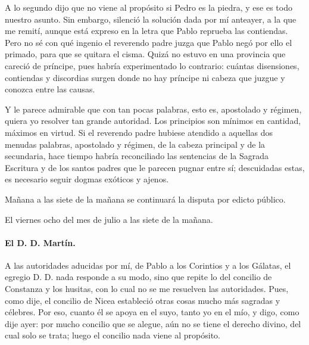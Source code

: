 A lo segundo dijo que no viene al propósito si Pedro es la piedra, y ese es todo nuestro asunto. Sin embargo, silenció la solución dada por mí anteayer, a la que me remití, aunque está expreso en la letra que Pablo reprueba las contiendas. Pero no sé con qué ingenio el reverendo padre juzga que Pablo negó por ello el primado, para que se quitara el cisma. Quizá no estuvo en una provincia que careció de príncipe, pues habría experimentado lo contrario: cuántas disensiones, contiendas y discordias surgen donde no hay príncipe ni cabeza que juzgue y conozca entre las causas.

Y le parece admirable que con tan pocas palabras, esto es, apostolado y régimen, quiera yo resolver tan grande autoridad. Los principios son mínimos en cantidad, máximos en virtud. Si el reverendo padre hubiese atendido a aquellas dos menudas palabras, apostolado y régimen, de la cabeza principal y de la secundaria, hace tiempo habría reconciliado las sentencias de la Sagrada Escritura y de los santos padres que le parecen pugnar entre sí; descuidadas estas, es necesario seguir dogmas exóticos y ajenos.

Mañana a las siete de la mañana se continuará la disputa por edicto público.

\marginpar{\small[313]} El viernes ocho del mes de julio a las siete de la mañana.

\paragraph*{El D. D. Martín.}

A las autoridades aducidas por mí, de Pablo a los Corintios y a los Gálatas, el egregio D. D. nada responde a su modo, sino que repite lo del concilio de Constanza y los husitas, con lo cual no se me resuelven las autoridades. Pues, como dije, el concilio de Nicea estableció otras cosas mucho más sagradas y célebres. Por eso, cuanto él se apoya en el suyo, tanto yo en el mío, y digo, como dije ayer: por mucho concilio que se alegue, aún no se tiene el derecho divino, del cual solo se trata; luego el concilio nada viene al propósito.

